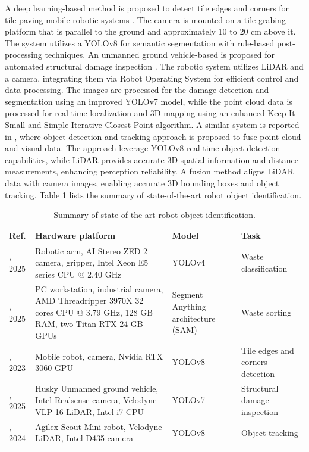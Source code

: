 \documentclass[preprint,12pt]{elsarticle}
\begin{document}
A deep learning-based method is proposed to detect tile edges and corners for tile-paving mobile robotic systems \citep{liu_automatic_2025}. The camera is mounted on a tile-grabing platform that is parallel to the ground and approximately 10 to 20 cm above it. The system utilizes a YOLOv8 for semantic segmentation with rule-based post-processing techniques. An unmanned ground vehicle-based is proposed for automated structural damage inspection \citep{ge_deep_2025}. The robotic system utilizes LiDAR and a camera, integrating them via Robot Operating System for efficient control and data processing. The images are processed for the damage detection and segmentation using an improved YOLOv7 model, while the point cloud data is processed for real-time localization and 3D mapping using an enhanced Keep It Small and Simple-Iterative Closest Point algorithm. A similar system is reported in \citep{dai_advanced_2024}, where object detection and tracking approach is proposed to fuse point cloud and visual data. The approach leverage YOLOv8 real-time object detection capabilities, while LiDAR provides accurate 3D spatial information and distance measurements, enhancing perception reliability. A fusion method aligns LiDAR data with camera images, enabling accurate 3D bounding boxes and object tracking. Table \ref{table_summary_objidn_studies} lists the summary of state-of-the-art robot object identification.

\begin{center}
\begin{table}
\caption{Summary of state-of-the-art robot object identification.}
\scriptsize
\begin{tabular}{|p{1cm} | p{4.5cm} | p{4.5cm} | p{3.0cm} |}
 \hline
 Ref. & Hardware platform & Model & Task \\ 
 \hline
 \citep{le_application_2025}, 2025 & Robotic arm, AI Stereo ZED 2 camera, gripper, Intel Xeon E5 series CPU @ 2.40 GHz & YOLOv4 & Waste classification \\ 
 \hline
 \citep{vukicevic_versatile_2025}, 2025 & PC workstation, industrial camera, AMD Threadripper 3970X 32 cores CPU @ 3.79 GHz, 128 GB RAM, two Titan RTX 24 GB GPUs & Segment Anything architecture (SAM) & Waste sorting \\
 \hline
\citep{kirillov_segment_2023}, 2023 & Mobile robot, camera, Nvidia RTX 3060 GPU & YOLOv8 & Tile edges and corners detection \\
 \hline
 \citep{ge_deep_2025}, 2025 & Husky Unmanned ground vehicle, Intel Realsense camera, Velodyne VLP-16 LiDAR, Intel i7 CPU & YOLOv7 & Structural damage inspection \\
 \hline
 \citep{dai_advanced_2024}, 2024 & Agilex Scout Mini robot, Velodyne LiDAR, Intel D435 camera & YOLOv8 & Object tracking \\ 
 \hline
\end{tabular}
\label{table_summary_objidn_studies}
\end{table}
\end{center}
\end{document}
